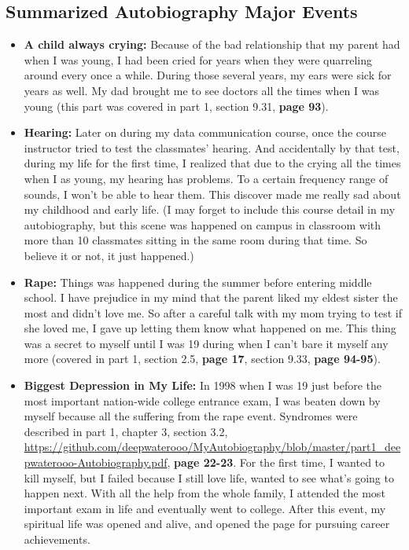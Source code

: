 \documentclass[9pt,b5paper]{article}
\begin{document}
\subsection{Summarized Autobiography Major Events}
\label{sec-9-1}
\begin{itemize}
\item \textbf{A child always crying:} Because of the bad relationship that my parent had when I was young, I had been cried for years when they were quarreling around every once a while. During those several years, my ears were sick for years as well. My dad brought me to see doctors all the times when I was young (this part was covered in part 1, section 9.31, \textbf{page 93}).
\item \textbf{Hearing:}  Later on during my data communication course, once the course instructor tried to test the classmates' hearing. And accidentally by that test, during my life for the first time, I realized that due to the crying all the times when I as young, my hearing has problems. To a certain frequency range of sounds, I won't be able to hear them. This discover made me really sad about my childhood and early life. (I may forget to include this course detail in my autobiography, but this scene was happened on campus in classroom with more than 10 classmates sitting in the same room during that time. So believe it or not, it just happened.)
\item \textbf{Rape:} Things was happened during the summer before entering middle school. I have prejudice in my mind that the parent liked my eldest sister the most and didn't love me. So after a careful talk with my mom trying to test if she loved me, I gave up letting them know what happened on me. This thing was a secret to myself until I was 19 during when I can't bare it myself any more (covered in part 1, section 2.5, \textbf{page 17}, section 9.33, \textbf{page 94-95}).
\item \textbf{Biggest Depression in My Life:} In 1998 when I was 19 just before the most important nation-wide college entrance exam, I was beaten down by myself because all the suffering from the rape event. Syndromes were described in part 1, chapter 3, section 3.2, \url{https://github.com/deepwaterooo/MyAutobiography/blob/master/part1_deepwaterooo-Autobiography.pdf}, \textbf{page 22-23}. For the first time, I wanted to kill myself, but I failed because I still love life, wanted to see what's going to happen next. With all the help from the whole family, I attended the most important exam in life and eventually went to college. After this event, my spiritual life was opened and alive, and opened the page for pursuing career achievements.

\end{itemize}
\end{document}
